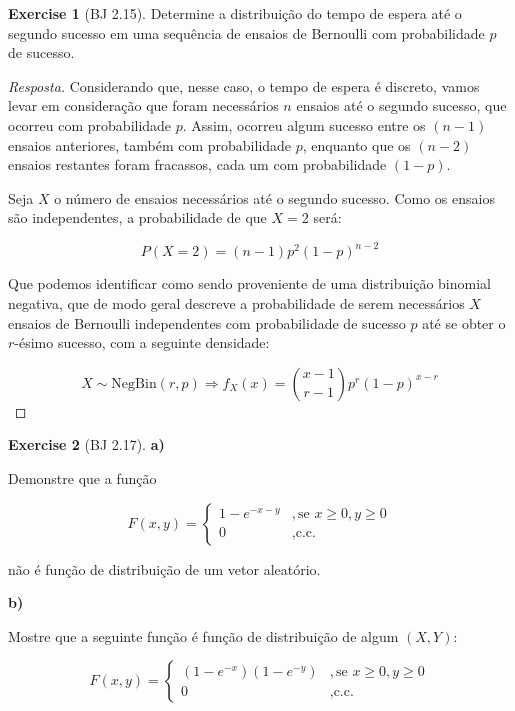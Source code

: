 \documentclass[
]{article}
\theoremstyle{definition}
\theoremstyle{definition}
\theoremstyle{definition}
\newtheorem{exercise}{Exercise}[section]
\theoremstyle{definition}
\theoremstyle{remark}
\begin{document}
\begin{exercise}[BJ 2.15]
Determine a distribuição do tempo de espera até o segundo sucesso em uma sequência de ensaios de Bernoulli com probabilidade \(p\) de sucesso.
\end{exercise}

\begin{proof}[Resposta]
Considerando que, nesse caso, o tempo de espera é discreto, vamos levar em consideração que foram necessários \(n\) ensaios até o segundo sucesso, que ocorreu com probabilidade \(p\). Assim, ocorreu algum sucesso entre os \((n-1)\) ensaios anteriores, também com probabilidade \(p\), enquanto que os \((n-2)\) ensaios restantes foram fracassos, cada um com probabilidade \((1 - p)\).

Seja \(X\) o número de ensaios necessários até o segundo sucesso. Como os ensaios são independentes, a probabilidade de que \(X = 2\) será:

\begin{equation*}
P(X = 2) = (n-1)p^{2}(1-p)^{n-2}
\end{equation*}

Que podemos identificar como sendo proveniente de uma distribuição binomial negativa, que de modo geral descreve a probabilidade de serem necessários \(X\) ensaios de Bernoulli independentes com probabilidade de sucesso \(p\) até se obter o \(r\)-ésimo sucesso, com a seguinte densidade:

\begin{equation*}
X \sim \mathrm{NegBin}(r,p) \Rightarrow f_{X}(x) = \binom{x-1}{r-1}p^{r}(1-p)^{x-r}
\end{equation*}
\end{proof}

\begin{exercise}[BJ 2.17]
\protect\hypertarget{exr:exer217}{}\label{exr:exer217}\textbf{a)}

Demonstre que a função

\begin{equation*}
F(x,y) = \begin{cases}
1 - e^{-x-y} &,\text{se }x \ge 0, y \ge 0 \\
0 &,\text{c.c.}
\end{cases}
\end{equation*}

não é função de distribuição de um vetor aleatório.

\textbf{b)}

Mostre que a seguinte função é função de distribuição de algum \((X,Y)\):

\begin{equation*}
F(x,y) = \begin{cases}
(1 - e^{-x})(1 - e^{-y}) &,\text{se }x \ge 0, y \ge 0 \\
0 &,\text{c.c.}
\end{cases}
\end{equation*}
\end{exercise}
\end{document}
